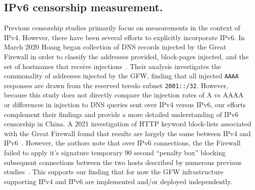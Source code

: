 \subsection{IPv6 censorship measurement.}
Previous censorship studies primarily focus on measurements in the context of
IPv4. However, there have been several efforts to explicitly incorporate IPv6.
In March 2020 Hoang \etal began collection of DNS records injected by the Great
Firewall in order to classify the addresses provided, block-pages injected, and
the set of hostnames that receive injections~\cite{USESEC21:GFWatch}. Their
analysis investigates the commonality of addresses injected by the GFW, finding
that all injected \texttt{AAAA} responses are drawn from the reserved teredo
subnet \texttt{2001::/32}. However, because this study does not directly
compare the injection rates of A vs AAAA or differences in injection to DNS
queries sent over IPv4 versus IPv6, our efforts complement their findings and
provide a more detailed understanding of IPv6 censorship in China.
%
A 2021 investigation of HTTP keyword block-lists associated with the Great
Firewall found that results are largely the same between IPv4 and
IPv6~\cite{weinberg2021chinese}. However, the authors note that over IPv6
connections, the the Firewall failed to apply it's signature temporary 90 second
``penalty box'' blocking subsequent connections between the two hosts described
by numerous previous studies~\cite{xu2011internet,clayton2006ignoring}. This
supports our finding that for now the GFW infrastructure supporting IPv4 and
IPv6 are implemented and/or deployed independently.
